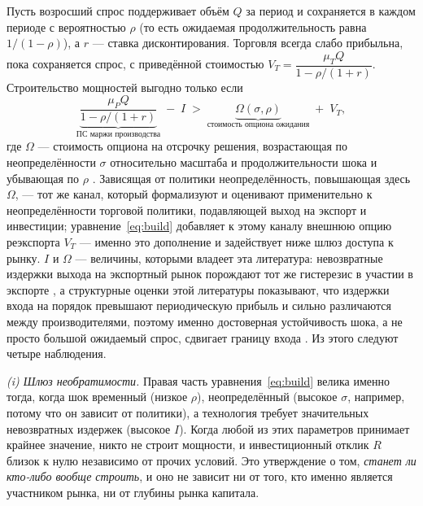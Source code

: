 \documentclass[12pt]{article}
\begin{document}
Пусть возросший спрос поддерживает объём $Q$ за период и сохраняется в каждом периоде с
вероятностью $\rho$ (то есть ожидаемая продолжительность равна $1/(1-\rho)$), а $r$ — ставка
дисконтирования. Торговля всегда слабо прибыльна, пока сохраняется спрос, с приведённой
стоимостью $V_T = \dfrac{\mu_T Q}{1-\rho/(1+r)}$. Строительство мощностей выгодно только
если
\begin{equation}
\underbrace{\frac{\mu_P Q}{1-\rho/(1+r)}}_{\text{ПС маржи производства}} \;-\; I
\;>\; \underbrace{\Omega(\sigma,\rho)}_{\text{стоимость опциона ожидания}} \;+\; V_T ,
\label{eq:build}
\end{equation}
где $\Omega$ — стоимость опциона на отсрочку решения, возрастающая по неопределённости
$\sigma$ относительно масштаба и продолжительности шока и убывающая по $\rho$
\citep{dixitpindyck1994}. Зависящая от политики неопределённость, повышающая здесь $\Omega$,
— тот же канал, который \citet{handleylimao2015,handleylimao2017} формализуют и оценивают
применительно к неопределённости торговой политики, подавляющей выход на экспорт и
инвестиции; уравнение~\eqref{eq:build} добавляет к этому каналу внешнюю опцию реэкспорта
$V_T$ — именно это дополнение и задействует ниже шлюз доступа к рынку. $I$ и $\Omega$ —
величины, которыми владеет эта литература: невозвратные издержки выхода на экспортный рынок
порождают тот же гистерезис в участии в экспорте \citep{robertstybout1997}, а структурные
оценки этой литературы показывают, что издержки входа на порядок превышают периодическую
прибыль и сильно различаются между производителями, поэтому именно достоверная устойчивость
шока, а не просто большой ожидаемый спрос, сдвигает границу входа
\citep{dasrobertstybout2007}. Из этого следуют четыре наблюдения.

\emph{(i) Шлюз необратимости.} Правая часть уравнения~\eqref{eq:build} велика именно тогда,
когда шок временный (низкое $\rho$), неопределённый (высокое $\sigma$, например, потому что
он зависит от политики), а технология требует значительных невозвратных издержек (высокое
$I$). Когда любой из этих параметров принимает крайнее значение, никто не строит мощности, и
инвестиционный отклик $R$ близок к нулю независимо от прочих условий. Это утверждение о
том, \emph{станет ли кто-либо вообще строить}, и оно не зависит ни от того, кто именно
является участником рынка, ни от глубины рынка капитала.
\end{document}
